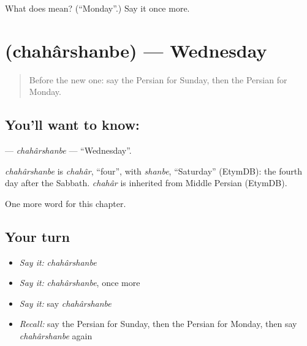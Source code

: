 \begin{tcolorbox}[breakable,colback=teal!4,colframe=teal!35!black,title={Before you move on}]
What does  mean? (\textquotedblleft{}Monday\textquotedblright{}.) Say it once more.
\end{tcolorbox}
\section[\texorpdfstring{\fa{چهارشنبه} (chahârshanbe)}{چهارشنبه (chahârshanbe)}]{ (chahârshanbe) — Wednesday}

\label{lesson:FA-C81-chaharshanbe}



\begin{quote}
Before the new one: say the Persian for Sunday, then the Persian for Monday.
\end{quote}

\subsection*{You'll want to know: }
\textbf{} — \emph{chahârshanbe} — \textquotedblleft{}Wednesday\textquotedblright{}.

\begin{cousinweb}
\emph{chahârshanbe} is \emph{chahâr}, \textquotedblleft{}four\textquotedblright{}, with \emph{shanbe}, \textquotedblleft{}Saturday\textquotedblright{} (EtymDB): the fourth day after the Sabbath. \emph{chahâr} is inherited from Middle Persian (EtymDB).
\end{cousinweb}

\begin{grammarlens}[title={What you've built}]
One more word for this chapter.
\end{grammarlens}

\subsection*{Your turn}
\begin{itemize}
\raggedright
  \item \emph{Say it:} \emph{chahârshanbe}
  \item \emph{Say it:} \emph{chahârshanbe}, once more
  \item \emph{Say it:} say \emph{chahârshanbe}
  \item \emph{Recall:} say the Persian for Sunday, then the Persian for Monday, then say \emph{chahârshanbe} again
\end{itemize}


